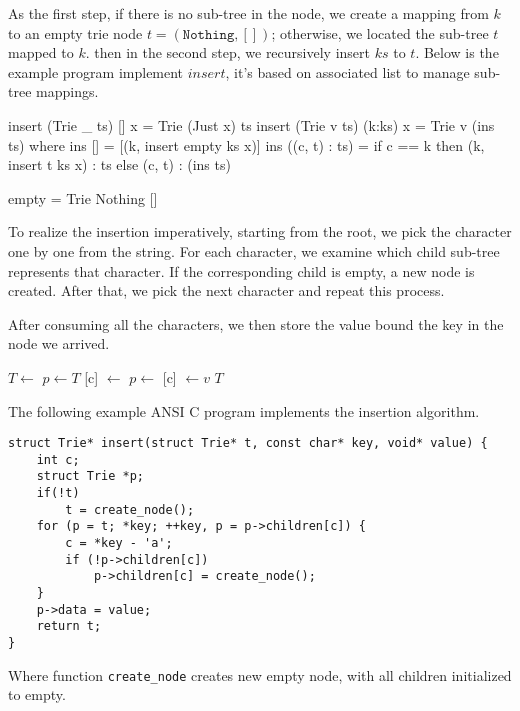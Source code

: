 \documentclass[b5paper]{article}
\begin{document}
As the first step, if there is no sub-tree in the node, we create a mapping from $k$ to an empty trie node $t = (\texttt{Nothing}, [])$; otherwise, we located the sub-tree $t$ mapped to $k$. then in the second step, we recursively insert $ks$ to $t$. Below is the example program implement $insert$, it's based on associated list to manage sub-tree mappings.

\begin{Haskell}
insert (Trie _ ts) [] x = Trie (Just x) ts
insert (Trie v ts) (k:ks) x = Trie v (ins ts) where
    ins [] = [(k, insert empty ks x)]
    ins ((c, t) : ts) = if c == k then (k, insert t ks x) : ts
                        else (c, t) : (ins ts)

empty = Trie Nothing []
\end{Haskell}

To realize the insertion imperatively, starting from the root, we pick the character
one by one from the string. For each character, we examine which child sub-tree
represents that character. If the corresponding child is empty, a new node is
created. After that, we pick the next character and repeat this process.

After consuming all the characters, we then store the
value bound the key in the node we arrived.

\begin{algorithmic}[1]
    \State $T \gets $ 
  \EndIf
  \State $p \gets T$
      \State {}[c] $\gets$ 
    \EndIf
    \State $p \gets $ [c]
  \EndFor
  \State {} $\gets v$
  \State \Return $T$
\EndFunction
\end{algorithmic}

The following example ANSI C program implements the insertion algorithm.

\lstset{language=C}
\begin{lstlisting}
struct Trie* insert(struct Trie* t, const char* key, void* value) {
    int c;
    struct Trie *p;
    if(!t)
        t = create_node();
    for (p = t; *key; ++key, p = p->children[c]) {
        c = *key - 'a';
        if (!p->children[c])
            p->children[c] = create_node();
    }
    p->data = value;
    return t;
}
\end{lstlisting}

Where function \texttt{create\_node} creates new empty node, with all
children initialized to empty.
\end{document}
